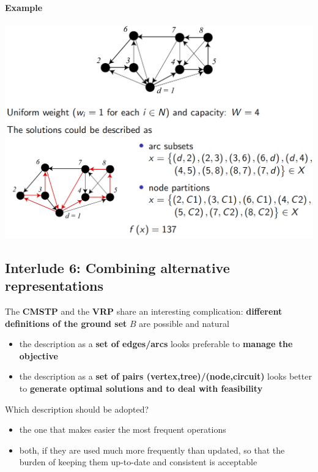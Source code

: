 \documentclass[11pt]{article}
\begin{document}
	\paragraph{Example}
	\begin{center}
		\includegraphics[width=0.9\columnwidth]{img/VRP1}
	\end{center}
	
	\newpage
	
	\subsection*{Interlude 6: Combining alternative representations}
	The \textbf{CMSTP} and the \textbf{VRP} share an interesting complication: \textbf{different definitions of the ground set} $B$ are possible and natural
	\begin{itemize}
		\item the description as a \textbf{set of edges/arcs} looks preferable to \textbf{manage the objective}
		\item the description as a \textbf{set of pairs (vertex,tree)/(node,circuit)} looks better to \textbf{generate optimal solutions and to deal with feasibility}
	\end{itemize}
	
	Which description should be adopted?
	\begin{itemize}
		\item the one that makes easier the most frequent operations
		\item both, if they are used much more frequently than updated, so that the burden of keeping them up-to-date and consistent is acceptable
	\end{itemize}
	
\end{document}
